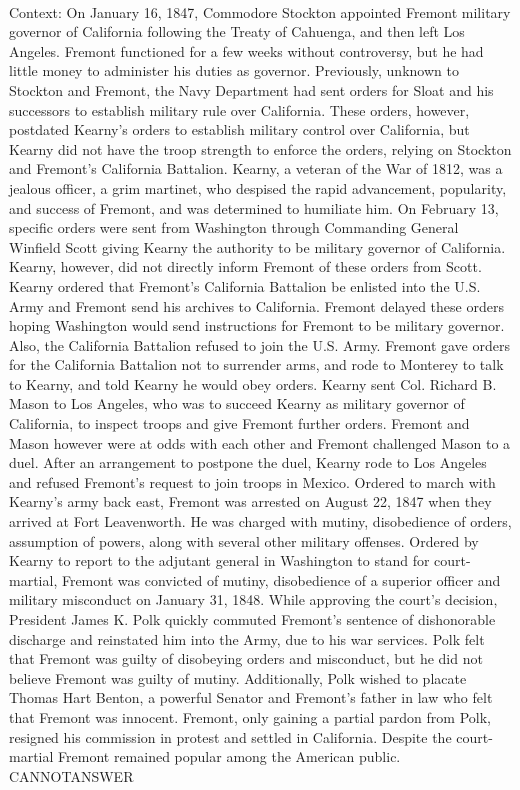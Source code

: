 \documentclass[11pt,a4paper, onecolumn]{article}
\begin{document}
\\ Context: On January 16, 1847, Commodore Stockton appointed Fremont military governor of California following the Treaty of Cahuenga, and then left Los Angeles. Fremont functioned for a few weeks without controversy, but he had little money to administer his duties as governor. Previously, unknown to Stockton and Fremont, the Navy Department had sent orders for Sloat and his successors to establish military rule over California. These orders, however, postdated Kearny's orders to establish military control over California, but Kearny did not have the troop strength to enforce the orders, relying on Stockton and Fremont's California Battalion. Kearny, a veteran of the War of 1812, was a jealous officer, a grim martinet, who despised the rapid advancement, popularity, and success of Fremont, and was determined to humiliate him. On February 13, specific orders were sent from Washington through Commanding General Winfield Scott giving Kearny the authority to be military governor of California. Kearny, however, did not directly inform Fremont of these orders from Scott. Kearny ordered that Fremont's California Battalion be enlisted into the U.S. Army and Fremont send his archives to California. Fremont delayed these orders hoping Washington would send instructions for Fremont to be military governor. Also, the California Battalion refused to join the U.S. Army. Fremont gave orders for the California Battalion not to surrender arms, and rode to Monterey to talk to Kearny, and told Kearny he would obey orders. Kearny sent Col. Richard B. Mason to Los Angeles, who was to succeed Kearny as military governor of California, to inspect troops and give Fremont further orders. Fremont and Mason however were at odds with each other and Fremont challenged Mason to a duel. After an arrangement to postpone the duel, Kearny rode to Los Angeles and refused Fremont's request to join troops in Mexico. Ordered to march with Kearny's army back east, Fremont was arrested on August 22, 1847 when they arrived at Fort Leavenworth. He was charged with mutiny, disobedience of orders, assumption of powers, along with several other military offenses. Ordered by Kearny to report to the adjutant general in Washington to stand for court-martial, Fremont was convicted of mutiny, disobedience of a superior officer and military misconduct on January 31, 1848. While approving the court's decision, President James K. Polk quickly commuted Fremont's sentence of dishonorable discharge and reinstated him into the Army, due to his war services. Polk felt that Fremont was guilty of disobeying orders and misconduct, but he did not believe Fremont was guilty of mutiny. Additionally, Polk wished to placate Thomas Hart Benton, a powerful Senator and Fremont's father in law who felt that Fremont was innocent. Fremont, only gaining a partial pardon from Polk, resigned his commission in protest and settled in California. Despite the court-martial Fremont remained popular among the American public. CANNOTANSWER
\end{document}
